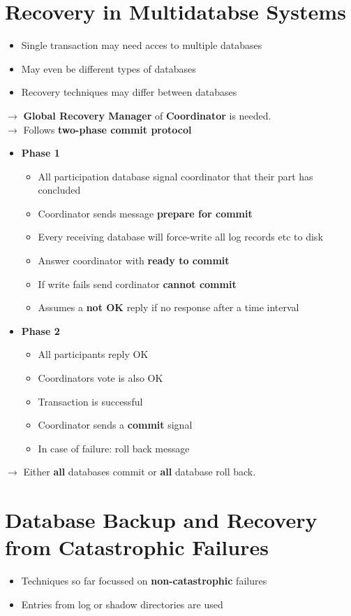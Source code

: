 \section{Recovery in Multidatabse Systems}
\begin{itemize}
	\item Single transaction may need acces to multiple databases
	\item May even be different types of databases
	\item Recovery techniques may differ between databases
\end{itemize}
$\rightarrow$ \textbf{Global Recovery Manager} of \textbf{Coordinator} is needed. \\
$\rightarrow$ Follows \textbf{two-phase commit protocol}
\begin{itemize}
	\item \textbf{Phase 1} 
	\begin{itemize}
		\item All participation database signal coordinator that their part has concluded
		\item Coordinator sends message \textbf{prepare for commit}
		\item Every receiving database will force-write all log records etc to disk
		\item Answer coordinator with \textbf{ready to commit}
		\item If write fails send cordinator \textbf{cannot commit}
		\item Assumes a \textbf{not OK} reply if no response after a time interval
	\end{itemize}
	\item \textbf{Phase 2}
	\begin{itemize}
		\item All participants reply OK
		\item Coordinators vote is also OK
		\item Transaction is successful
		\item Coordinator sends a \textbf{commit} signal
		\item In case of failure: roll back message
	\end{itemize}
\end{itemize}
$\rightarrow$ Either \textbf{all} databases commit or \textbf{all} database roll back.
\section{Database Backup and Recovery from Catastrophic Failures}
\begin{itemize}
	\item Techniques so far focussed on \textbf{non-catastrophic} failures
	\item Entries from log or shadow directories are used
\end{itemize}
